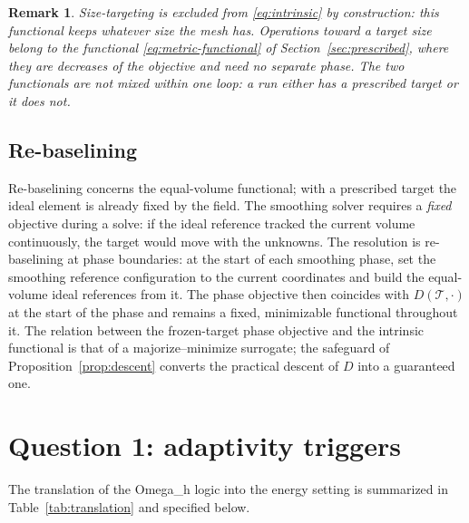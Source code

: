 \documentclass[11pt]{article}
\newcommand{\omegah}{Omega\_h}
\newtheorem{remark}{Remark}
\begin{document}
\begin{remark}
Size-targeting is excluded from \eqref{eq:intrinsic} by construction:
this functional keeps whatever size the mesh has. Operations toward a
target size belong to the functional \eqref{eq:metric-functional} of
Section~\ref{sec:prescribed}, where they are decreases of the objective
and need no separate phase. The two functionals are not mixed within
one loop: a run either has a prescribed target or it does not.
\end{remark}

\subsection{Re-baselining}

Re-baselining concerns the equal-volume functional; with a prescribed
target the ideal element is already fixed by the field. The smoothing
solver requires a \emph{fixed} objective during a solve:
if the ideal reference tracked the current volume continuously, the
target would move with the unknowns. The resolution is re-baselining at
phase boundaries: at the start of each smoothing phase, set the
smoothing reference configuration to the current coordinates and build
the equal-volume ideal references from it. The phase objective then
coincides with $D(\mathcal{T}, \cdot)$ at the start of the phase and
remains a fixed, minimizable functional throughout it. The relation
between the frozen-target phase objective and the intrinsic functional
is that of a majorize--minimize surrogate; the safeguard of
Proposition~\ref{prop:descent} converts the practical descent of $D$
into a guaranteed one.

\section{Question 1: adaptivity triggers}
\label{sec:triggers}

The translation of the \omegah{} logic into the energy setting is
summarized in Table~\ref{tab:translation} and specified below.
\end{document}

